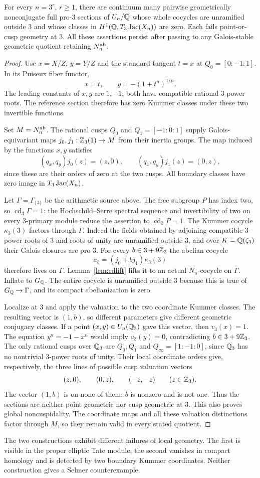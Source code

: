 \begin{proposition}\label{prop:boundaryfamily}
For every $n=3^r$, $r\geq1$, there are continuum many pairwise
geometrically nonconjugate full pro-$3$ sections of $U_n/\mathbb Q$ whose
whole cocycles are unramified outside $3$ and whose classes in
$H^1(\mathbb Q,T_3\operatorname{Jac}(X_n))$ are zero. Each fails point-or-cusp geometry
at $3$. All these assertions persist after passing to any
Galois-stable geometric quotient retaining $N_n^{\mathrm{ab}}$.
\end{proposition}
\begin{proof}
Use $x=X/Z$, $y=Y/Z$ and the standard tangent $t=x$ at
$Q_0=[0:-1:1]$. In its Puiseux fiber functor,
\[
x=t,\qquad y=-(1+t^n)^{1/n}.
\]
The leading constants of $x,y$ are $1,-1$; both have compatible
rational $3$-power roots. The reference section therefore has zero
Kummer classes under these two invertible functions.

Set $M=N_n^{\mathrm{ab}}$. The rational cusps $Q_0$ and
$Q_1=[-1:0:1]$ supply Galois-equivariant maps
$j_0,j_1:\mathbb Z_3(1)\to M$ from their inertia groups.
The map induced by the functions $x,y$ satisfies
\[
(q_x,q_y)j_0(z)=(z,0),\qquad
(q_x,q_y)j_1(z)=(0,z),
\]
since these are their orders of zero at the two cusps.
All boundary classes have zero image in $T_3\operatorname{Jac}(X_n)$.

Let $\Gamma=\Gamma_{\{3\}}$ be the arithmetic source above.
The free subgroup $P$ has index two, so
$\operatorname{cd}_3\Gamma=1$: the Hochschild--Serre spectral sequence
and invertibility of two on every $3$-primary module reduce the
assertion to $\operatorname{cd}_3P=1$.
The Kummer cocycle $\kappa_3(3)$ factors through $\Gamma$.
Indeed the fields obtained by adjoining compatible $3$-power roots
of $3$ and roots of unity are unramified outside $3$, and over
$K=\mathbb Q(\zeta_3)$ their Galois closures are pro-$3$.
For every $b\in3+9\mathbb Z_3$ the abelian cocycle
\[
a_b=(j_0+bj_1)\kappa_3(3)
\]
therefore lives on $\Gamma$. Lemma~\ref{lem:cdlift} lifts it to an
actual $N_n$-cocycle on $\Gamma$. Inflate to $G_\mathbb Q$.
The entire cocycle is unramified outside $3$ because this is true
of $G_\mathbb Q\to\Gamma$, and its compact abelianization is zero.

Localize at $3$ and apply the valuation to the two coordinate Kummer
classes. The resulting vector is $(1,b)$, so different parameters
give different geometric conjugacy classes.
If a point $(x,y)\in U_n(\mathbb Q_3)$ gave this vector, then
$v_3(x)=1$. The equation $y^n=-1-x^n$ would imply $v_3(y)=0$,
contradicting $b\in3+9\mathbb Z_3$.
The only rational cusps over $\mathbb Q_3$ are $Q_0,Q_1$ and
$Q_\infty=[1:-1:0]$, since $\mathbb Q_3$ has no nontrivial
$3$-power roots of unity. Their local coordinate orders give,
respectively, the three lines of possible cusp valuation vectors
\[
(z,0),\qquad(0,z),\qquad(-z,-z)\qquad(z\in\mathbb Z_3).
\]
The vector $(1,b)$ is on none of them: $b$ is nonzero and is not one.
Thus the sections are neither point geometric nor cusp geometric
at $3$. This also proves global noncuspidality. The coordinate maps
and all these valuation distinctions factor through $M$, so they
remain valid in every stated quotient.
\end{proof}

The two constructions exhibit different failures of local geometry.
The first is visible in the proper elliptic Tate module; the second
vanishes in compact homology and is detected by two boundary Kummer
coordinates. Neither construction gives a Selmer counterexample.
